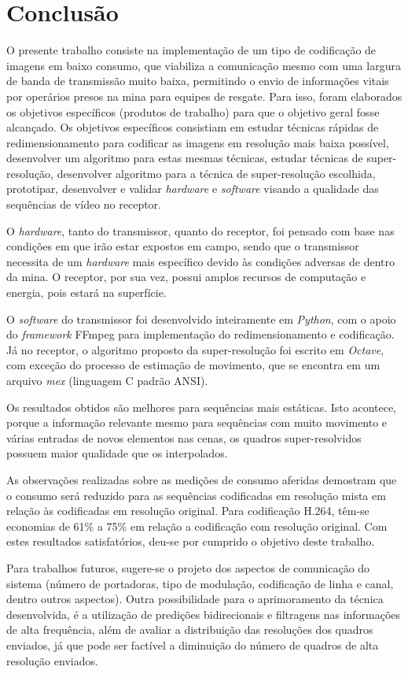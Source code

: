 \chapter[Conclusão]{Conclusão}

O presente trabalho consiste na implementação de um tipo de codificação de imagens em baixo consumo, que viabiliza a comunicação mesmo com uma largura de banda de transmissão muito baixa, permitindo o envio de informações vitais por operários presos na mina para equipes de resgate. 
Para isso, foram elaborados os objetivos específicos (produtos de trabalho) para que o objetivo geral fosse alcançado. Os objetivos específicos consistiam em estudar técnicas rápidas de redimensionamento para codificar as imagens em resolução mais baixa possível, desenvolver um algoritmo para estas mesmas técnicas, estudar técnicas de super-resolução, desenvolver algoritmo para a técnica de super-resolução escolhida, prototipar, desenvolver e validar \textit{hardware} e \textit{software} visando a qualidade das sequências de vídeo no receptor.

O \textit{hardware}, tanto do transmissor, quanto do receptor, foi pensado com base nas condições em que irão estar expostos em campo, sendo que o transmissor necessita de um \textit{hardware} mais específico devido às condições adversas de dentro da mina. O receptor, por sua vez, possui amplos recursos de computação e energia, pois estará na superfície.

O \textit{software} do transmissor foi desenvolvido inteiramente em \textit{Python}, com o apoio do \textit{framework} FFmpeg para implementação do redimensionamento e codificação. Já no receptor, o algoritmo proposto da super-resolução foi escrito em \textit{Octave}, com exceção do processo de estimação de movimento, que se encontra em um arquivo \textit{mex} (linguagem C padrão ANSI).  

Os resultados obtidos são melhores para sequências mais estáticas. Isto acontece, porque a informação relevante mesmo para sequências com muito movimento e várias entradas de novos elementos nas cenas, os quadros super-resolvidos possuem maior qualidade que os interpolados. 

As observações realizadas sobre as medições de consumo aferidas demostram que o consumo será reduzido para as sequências codificadas em resolução mista em relação às codificadas em resolução original. Para codificação H.264, têm-se economias de 61\% a 75\% em relação a codificação com resolução original. Com estes resultados satisfatórios, deu-se por cumprido o objetivo deste trabalho. 


Para trabalhos futuros, sugere-se o projeto dos aspectos de comunicação do sistema (número de portadoras, tipo de modulação, codificação de linha e canal, dentro outros aspectos). Outra possibilidade para o aprimoramento da técnica desenvolvida, é a utilização de predições bidirecionais e filtragens nas informações de alta frequência, além de avaliar a distribuição das resoluções dos quadros enviados, já que pode ser factível a diminuição do número de quadros de alta resolução enviados.

